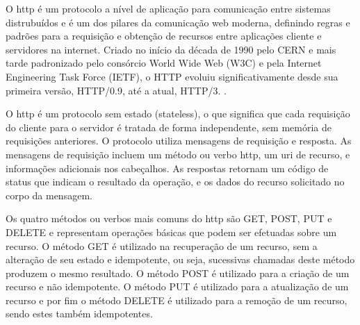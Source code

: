 O \gls{http} é um protocolo a nível de aplicação para comunicação entre sistemas distrubuídos e é um dos pilares da comunicação web moderna, definindo regras e padrões para a requisição e obtenção de recursos entre aplicações cliente e servidores na internet. Criado no início da década de 1990 pelo CERN e mais tarde padronizado pelo consórcio World Wide Web (W3C) e pela Internet Engineering Task Force (IETF), o HTTP evoluiu significativamente desde sua primeira versão, HTTP/0.9, até a atual, HTTP/3. \cite{Fielding1999}.

O \gls{http} é um protocolo sem estado (stateless), o que significa que cada requisição do cliente para o servidor é tratada de forma independente, sem memória de requisições anteriores. O protocolo utiliza mensagens de requisição e resposta. As mensagens de requisição incluem um método ou verbo \gls{http}, um \gls{uri} de recurso, e informações adicionais nos cabeçalhos. As respostas retornam um código de status que indicam o resultado da operação, e os dados do recurso solicitado no corpo da mensagem.

Os quatro métodos ou verbos mais comuns do \gls{http} são GET, POST, PUT e DELETE e representam operações básicas que podem ser efetuadas sobre um recurso. O método GET é utilizado na recuperação de um recurso, sem a alteração de seu estado e idempotente, ou seja, sucessivas chamadas deste método produzem o mesmo resultado. O método POST é utilizado para a criação de um recurso e não idempotente. O método PUT é utilizado para a atualização de um recurso e por fim o método DELETE é utilizado para a remoção de um recurso, sendo estes também idempotentes.